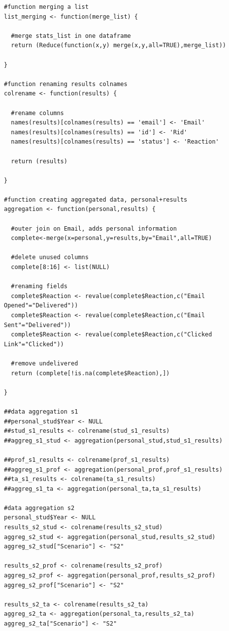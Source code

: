 \documentclass[a4paper]{article}
\begin{document}
\begin{lstlisting}
#function merging a list
list_merging <- function(merge_list) {
  
  #merge stats_list in one dataframe
  return (Reduce(function(x,y) merge(x,y,all=TRUE),merge_list))
  
}

#function renaming results colnames
colrename <- function(results) {
  
  #rename columns
  names(results)[colnames(results) == 'email'] <- 'Email'
  names(results)[colnames(results) == 'id'] <- 'Rid'
  names(results)[colnames(results) == 'status'] <- 'Reaction'
  
  return (results)
  
}

#function creating aggregated data, personal+results
aggregation <- function(personal,results) {
  
  #outer join on Email, adds personal information
  complete<-merge(x=personal,y=results,by="Email",all=TRUE)
  
  #delete unused columns
  complete[8:16] <- list(NULL)
  
  #renaming fields
  complete$Reaction <- revalue(complete$Reaction,c("Email Opened"="Delivered"))
  complete$Reaction <- revalue(complete$Reaction,c("Email Sent"="Delivered"))
  complete$Reaction <- revalue(complete$Reaction,c("Clicked Link"="Clicked"))
  
  #remove undelivered
  return (complete[!is.na(complete$Reaction),])
  
}

##data aggregation s1
##personal_stud$Year <- NULL
##stud_s1_results <- colrename(stud_s1_results)
##aggreg_s1_stud <- aggregation(personal_stud,stud_s1_results)

##prof_s1_results <- colrename(prof_s1_results)
##aggreg_s1_prof <- aggregation(personal_prof,prof_s1_results)
##ta_s1_results <- colrename(ta_s1_results)
##aggreg_s1_ta <- aggregation(personal_ta,ta_s1_results)

#data aggregation s2
personal_stud$Year <- NULL
results_s2_stud <- colrename(results_s2_stud)
aggreg_s2_stud <- aggregation(personal_stud,results_s2_stud)
aggreg_s2_stud["Scenario"] <- "S2"

results_s2_prof <- colrename(results_s2_prof)
aggreg_s2_prof <- aggregation(personal_prof,results_s2_prof)
aggreg_s2_prof["Scenario"] <- "S2"

results_s2_ta <- colrename(results_s2_ta)
aggreg_s2_ta <- aggregation(personal_ta,results_s2_ta)
aggreg_s2_ta["Scenario"] <- "S2"


\end{lstlisting}
\end{document}
